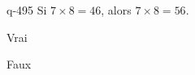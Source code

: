 \begin{truefalse}{q-495}
Si $7\times 8 = 46$, alors $7\times 8 = 56$.
\item* Vrai
\item Faux
\end{truefalse}

